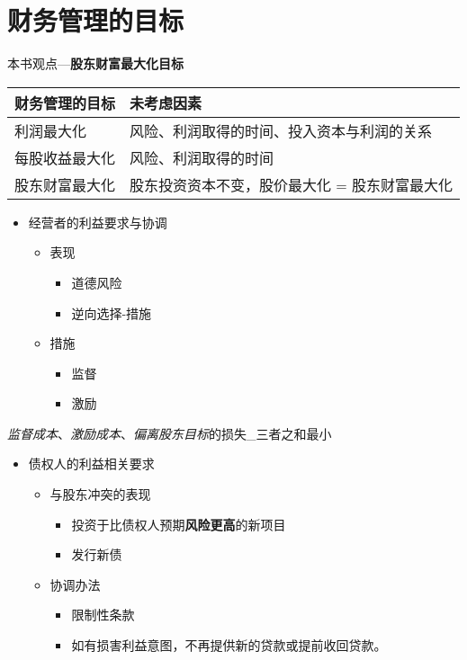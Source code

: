 \documentclass[12pt,a4paper]{article}
\begin{document}
\section{财务管理的目标}
\label{sec:orgfcae984}
本书观点---\textbf{股东财富最大化目标}
\begin{center}
\begin{tabular}{ll}
财务管理的目标 & 未考虑因素\\
\hline
利润最大化 & 风险、利润取得的时间、投入资本与利润的关系\\
每股收益最大化 & 风险、利润取得的时间\\
股东财富最大化 & 股东投资资本不变，股价最大化 = 股东财富最大化\\
\end{tabular}
\end{center}
\begin{itemize}
\item 经营者的利益要求与协调
\begin{itemize}
\item 表现
\begin{itemize}
\item 道德风险
\item 逆向选择-措施
\end{itemize}
\item 措施
\begin{itemize}
\item 监督
\item 激励
\end{itemize}
\end{itemize}
\end{itemize}
\emph{监督成本}、\emph{激励成本}、\emph{偏离股东目标}的损失\_三者之和最小
\begin{itemize}
\item 债权人的利益相关要求
\begin{itemize}
\item 与股东冲突的表现
\begin{itemize}
\item 投资于比债权人预期\textbf{风险更高}的新项目
\item 发行新债
\end{itemize}
\item 协调办法
\begin{itemize}
\item 限制性条款
\item 如有损害利益意图，不再提供新的贷款或提前收回贷款。
\end{itemize}
\end{itemize}
\end{itemize}
\end{document}
